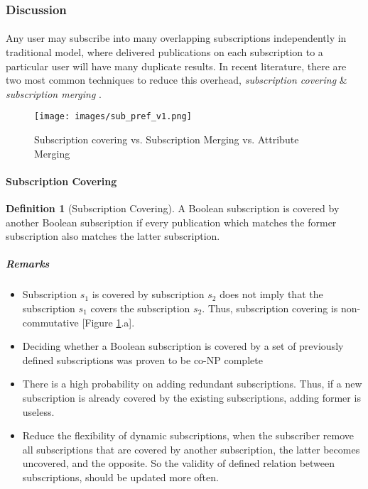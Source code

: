 \documentclass[a4paper,12pt,oneside]{book}
\theoremstyle{definition}
\newtheorem{definition}{Definition}[section]
\theoremstyle{remark}
\begin{document}
\subsubsection{Discussion}
\paragraph*{}
Any user may subscribe into many overlapping subscriptions independently in traditional model, where delivered publications on each subscription to a particular user will have many duplicate results. In recent literature, there are two most common techniques to reduce this overhead, \emph{subscription covering} \& \emph{subscription merging} \cite{Pripuzic2010}.

\begin{figure}[h]
\begin{center}
\texttt{[image: images/sub\_pref\_v1.png]}
\caption{Subscription covering vs. Subscription Merging vs. Attribute Merging}
\label{sub_pref}
\end{center}
\end{figure}

\paragraph*{Subscription Covering}
\begin{definition}[Subscription Covering]
A Boolean subscription is covered by another Boolean subscription if every publication which matches the former subscription also matches the latter subscription.
\end{definition}

\subparagraph*{Remarks}
\begin{itemize}
\item Subscription $s_1$ is covered by subscription $s_2$ does not imply that the subscription $s_1$ covers the subscription $s_2$. Thus, subscription covering is non-commutative [Figure \ref{sub_pref}.a].
\item Deciding whether a Boolean subscription is covered by a set of previously defined subscriptions was proven to be co-NP complete \cite{Pripuzic2010}
\item There is a high probability on adding redundant subscriptions. Thus, if a new subscription is already covered by the existing subscriptions, adding former is useless.
\item Reduce the flexibility of dynamic subscriptions, when the subscriber remove all subscriptions that are covered by another subscription, the latter becomes uncovered, and the opposite. So the validity of defined relation between subscriptions, should be updated more often.
\end{itemize}
\end{document}
